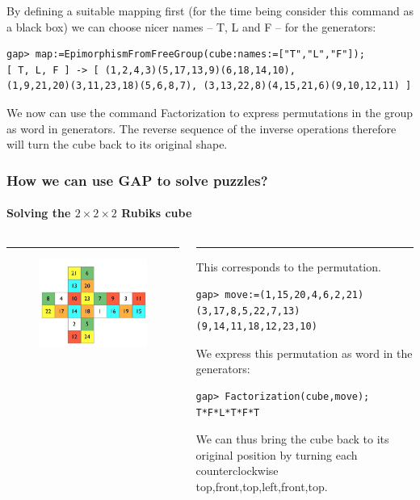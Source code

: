 \documentclass{beamer}
\theoremstyle{definition}
\theoremstyle{remark}
\begin{document}
\begin{frame}[fragile]
	By deﬁning a suitable mapping ﬁrst (for the time being consider this command as a black box) we
	can choose nicer names – T, L and F – for the generators:
\begin{verbatim}
gap> map:=EpimorphismFromFreeGroup(cube:names:=["T","L","F"]);
[ T, L, F ] -> [ (1,2,4,3)(5,17,13,9)(6,18,14,10),
(1,9,21,20)(3,11,23,18)(5,6,8,7), (3,13,22,8)(4,15,21,6)(9,10,12,11) ]
\end{verbatim}
	We now can use the command Factorization to express permutations in the group as word in
	generators. The reverse sequence of the inverse operations therefore will turn the cube back to its
	original shape.
\end{frame}
\LogoOff
\begin{frame}[fragile]
	\frametitle{How we can use GAP to solve puzzles?}
	\framesubtitle{Solving the $ 2 \times 2 \times 2 $ Rubiks cube}
	\begin{columns}[T] %
		\begin{column}{.48\textwidth}
			\color{red}\rule{\linewidth}{4pt}
			\begin{figure}
				\includegraphics[scale=0.4]{Rubik2}
			\end{figure}
		\end{column}%
		\hfill%
		\begin{column}{.48\textwidth}
			\color{blue}\rule{\linewidth}{4pt}
			\centering This corresponds to the permutation.
			\begin{verbatim}
gap> move:=(1,15,20,4,6,2,21)
(3,17,8,5,22,7,13)
(9,14,11,18,12,23,10)
			\end{verbatim}
			 We express
			 this permutation as word in the generators:
			 \begin{verbatim}
gap> Factorization(cube,move);
T*F*L*T*F*T
			 \end{verbatim}
			 We can thus bring the cube back to its original position by turning each counterclockwise top,front,top,left,front,top.
		\end{column}%
	\end{columns}
\end{frame}
\end{document}
